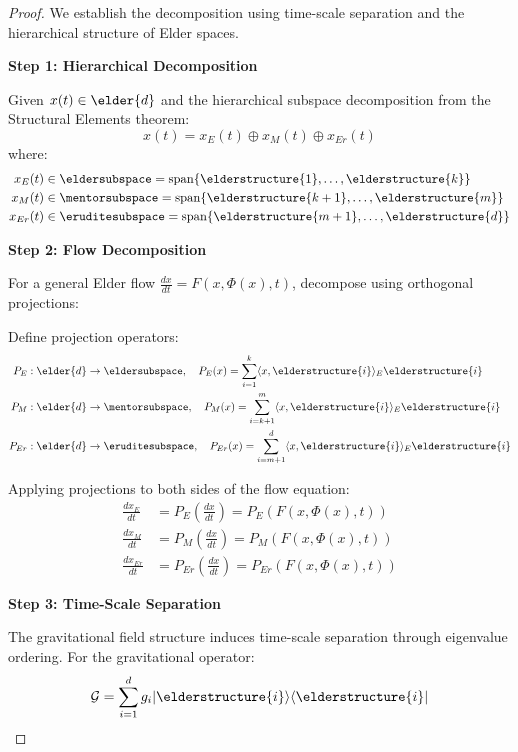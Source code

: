 \begin{proof}
We establish the decomposition using time-scale separation and the hierarchical structure of Elder spaces.

\textbf{Step 1: Hierarchical Decomposition}

Given $x(t) \in \elder{d}$ and the hierarchical subspace decomposition from the Structural Elements theorem:
$$x(t) = x_E(t) \oplus x_M(t) \oplus x_{Er}(t)$$
where:
\begin{align}
x_E(t) &\in \eldersubspace = \mathrm{span}\{\elderstructure{1}, \ldots, \elderstructure{k}\} \\
x_M(t) &\in \mentorsubspace = \mathrm{span}\{\elderstructure{k+1}, \ldots, \elderstructure{m}\} \\
x_{Er}(t) &\in \eruditesubspace = \mathrm{span}\{\elderstructure{m+1}, \ldots, \elderstructure{d}\}
\end{align}

\textbf{Step 2: Flow Decomposition}

For a general Elder flow $\frac{dx}{dt} = F(x, \Phi(x), t)$, decompose using orthogonal projections:

Define projection operators:
\begin{align}
P_E &: \elder{d} \rightarrow \eldersubspace, \quad P_E(x) = \sum_{i=1}^{k} \langle x, \elderstructure{i} \rangle_E \elderstructure{i} \\
P_M &: \elder{d} \rightarrow \mentorsubspace, \quad P_M(x) = \sum_{i=k+1}^{m} \langle x, \elderstructure{i} \rangle_E \elderstructure{i} \\
P_{Er} &: \elder{d} \rightarrow \eruditesubspace, \quad P_{Er}(x) = \sum_{i=m+1}^{d} \langle x, \elderstructure{i} \rangle_E \elderstructure{i}
\end{align}

Applying projections to both sides of the flow equation:
\begin{align}
\frac{dx_E}{dt} &= P_E\left(\frac{dx}{dt}\right) = P_E(F(x, \Phi(x), t)) \\
\frac{dx_M}{dt} &= P_M\left(\frac{dx}{dt}\right) = P_M(F(x, \Phi(x), t)) \\
\frac{dx_{Er}}{dt} &= P_{Er}\left(\frac{dx}{dt}\right) = P_{Er}(F(x, \Phi(x), t))
\end{align}

\textbf{Step 3: Time-Scale Separation}

The gravitational field structure induces time-scale separation through eigenvalue ordering. For the gravitational operator:
$$\mathcal{G} = \sum_{i=1}^{d} g_i |\elderstructure{i}\rangle\langle\elderstructure{i}|$$


\end{proof}
